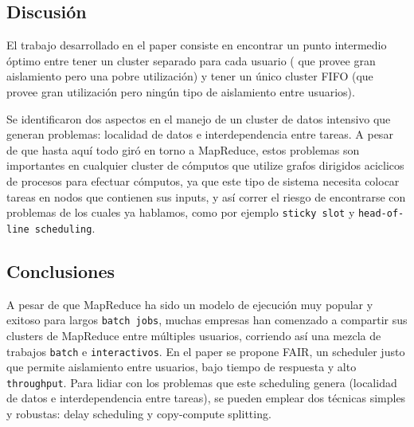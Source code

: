 \documentclass[11pt, a4paper, twoside]{article}
\begin{document}
\clearpage
\subsection {\footnotesize Discusión}
\label{investigacion-8}

El trabajo desarrollado en el paper consiste en encontrar un punto
intermedio óptimo entre tener un cluster separado para cada usuario (
que provee gran aislamiento pero una pobre utilización) y tener un único
cluster FIFO (que provee gran utilización pero ningún tipo de
aislamiento entre usuarios).

Se identificaron dos aspectos en el manejo de un cluster de datos
intensivo que generan problemas: localidad de datos e interdependencia
entre tareas. A pesar de que hasta aquí  todo giró en torno a MapReduce, estos
problemas son importantes en cualquier cluster de cómputos que utilize
grafos dirigidos aciclicos de procesos para efectuar cómputos, ya que este
tipo de sistema necesita colocar tareas en nodos que contienen sus inputs, y
así correr el riesgo de encontrarse con problemas de los cuales ya hablamos,
como por ejemplo \texttt{sticky slot}  y \texttt{head-of-line scheduling}.

\clearpage
\subsection {\footnotesize Conclusiones}
\label{investigacion-9}

A pesar de que MapReduce ha sido un modelo de ejecución muy popular y exitoso
para largos \texttt{batch jobs}, muchas empresas han comenzado a compartir
sus clusters de MapReduce entre múltiples usuarios, corriendo así una mezcla
de trabajos \texttt{batch} e \texttt{interactivos}. En el paper se propone
FAIR, un scheduler justo que permite aislamiento entre usuarios, bajo tiempo
de respuesta y alto \texttt{throughput}. Para lidiar con los problemas que este
scheduling genera (localidad de datos e interdependencia entre tareas),
se pueden emplear dos técnicas simples y robustas: delay scheduling y
copy-compute splitting.

\clearpage
\end{document}

